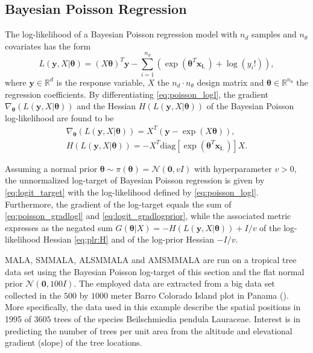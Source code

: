 \documentclass[twoside,11pt]{article}
\begin{document}
\subsection{Bayesian Poisson Regression}

The log-likelihood of a Bayesian Poisson regression model with $n_d$ samples and $n_{\theta}$ covariates has the form
\begin{equation}
\label{eq:poisson_logl}
L(\mathbf{y}, X | \boldsymbol{\theta})=
(X\boldsymbol{\theta})^T\mathbf{y}-
\sum_{i=1}^{n_d}\left(
\exp(\boldsymbol{\theta}^T\mathbf{x_{i,}})
+\log{(y_i!)}
\right),
\end{equation}
where $\mathbf{y}\in\mathbb{R}^d$ is the response variable, $X$ the $n_d\cdot n_{\theta}$ design matrix and 
$\boldsymbol{\theta}\in\mathbb{R}^{n_{\theta}}$ the regression coefficients. By differentiating \eqref{eq:poisson_logl}, the 
gradient $\nabla_{\boldsymbol{\theta}}(L(\mathbf{y},X|\boldsymbol{\theta}))$ and the Hessian
$H(L(\mathbf{y}, X | \boldsymbol{\theta}))$ of the Bayesian Poisson log-likelihood are found to be
\begin{eqnarray}
\label{eq:poisson_gradlogl}
\nabla_{\boldsymbol{\theta}}(L(\mathbf{y},X|\boldsymbol{\theta}))=
X^T\left(\mathbf{y}-
\exp\left(X\boldsymbol{\theta}\right)\right),\\
\label{eq:plr:H}
H(L(\mathbf{y}, X | \boldsymbol{\theta}))=-X^T\mbox{diag}\left[\exp(\boldsymbol{\theta}^T\mathbf{x_{i,}})\right]X.
\end{eqnarray}

Assuming a normal prior $\boldsymbol{\theta}\sim\pi({\boldsymbol{\theta}})=\mathcal{N}(\boldsymbol{0},vI)$ with 
hyperparameter $v>0$, the unnormalized log-target of Bayesian Poisson regression is given by \eqref{eq:logit_target}
with the log-likelihood defined by \eqref{eq:poisson_logl}. Furthermore, the gradient of the log-target equals the sum of
\eqref{eq:poisson_gradlogl} and \eqref{eq:logit_gradlogprior}, while the associated metric
expresses as the negated sum $G(\boldsymbol{\theta}|X)=-H(L(\mathbf{y}, X | \boldsymbol{\theta}))+I/v$ of the log-likelihood 
Hessian \eqref{eq:plr:H} and of the log-prior Hessian $-I/v$.

MALA, SMMALA, ALSMMALA and AMSMMALA are run on a tropical tree data set using the Bayesian Poisson log-target of this 
section and the flat normal prior $\mathcal{N}(\boldsymbol{0},100I)$. The employed data are extracted from a big data set 
collected in the $500$ by $1000$ meter Barro Colorado Island plot in Panama (\cite{con_hub_fos__cha}). More specifically, 
the data used in this example describe the spatial positions in 1995 of $3605$ trees of the species Beilschmiedia pendula 
Lauraceae. Interest is in predicting the number of trees per unit area from the altitude and elevational gradient (slope) of 
the tree locations.
\end{document}
